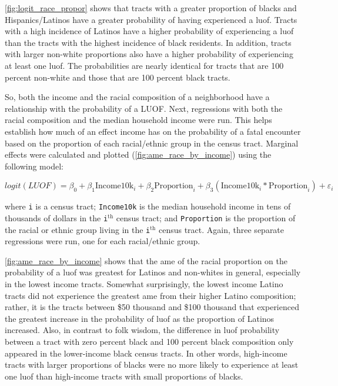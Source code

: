 \documentclass[12pt]{article}
\begin{document}
\autoref{fig:logit_race_propor} shows that tracts with a greater proportion of blacks and Hispanics/Latinos have a greater probability of having experienced a \acrfull{luof}. Tracts with a high incidence of Latinos have a higher probability of experiencing a \acrshort{luof} than the tracts with the highest incidence of black residents. In addition, tracts with larger non-white proportions also have a higher probability of experiencing at least one \acrshort{luof}. The probabilities are nearly identical for tracts that are 100 percent non-white and those that are 100 percent black tracts.

So, both the income and the racial composition of a neighborhood have a relationship with the probability of a LUOF. Next, regressions with both the racial composition and the median household income were run. This helps establish how much of an effect income has on the probability of a fatal encounter based on the proportion of each racial/ethnic group in the census tract. Marginal effects were calculated and plotted (\autoref{fig:ame_race_by_income}) using the following model:

\begin{equation}
logit(LUOF) = \beta_0 + \beta_1 \text{Income10k}_i + \beta_2 \text{Proportion}_i + \beta_3 (\text{Income10k}_i \ast \text{Proportion}_i) + \varepsilon_i
\label{eq:logit_interaction}
\end{equation}

\noindent{}where \texttt{i} is a census tract; \texttt{Income10k} is the median household income in tens of thousands of dollars in the \texttt{i}$^\text{th}$ census tract; and \texttt{Proportion} is the proportion of the racial or ethnic group living in the \texttt{i}$^\text{th}$ census tract. Again, three separate regressions were run, one for each racial/ethnic group.

\autoref{fig:ame_race_by_income} shows that the \gls{ame} of the racial proportion on the probability of a \acrshort{luof} was greatest for Latinos and non-whites in general, especially in the lowest income tracts. Somewhat surprisingly, the lowest income Latino tracts did not experience the greatest \acrshort{ame} from their higher Latino composition; rather, it is the tracts between \$50 thousand and \$100 thousand that experienced the greatest increase in the probability of \acrshort{luof} as the proportion of Latinos increased. Also, in contrast to folk wisdom, the difference in \acrshort{luof} probability between a tract with zero percent black and 100 percent black composition only appeared in the lower-income black census tracts. In other words, high-income tracts with larger proportions of blacks were no more likely to experience at least one \acrshort{luof} than high-income tracts with small proportions of blacks.
\end{document}
